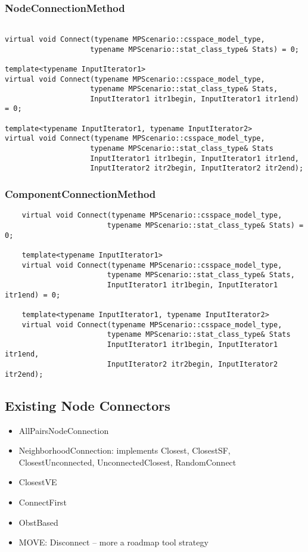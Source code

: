 \subsubsection{NodeConnectionMethod}
\begin{lstlisting}

virtual void Connect(typename MPScenario::csspace_model_type, 
                    typename MPScenario::stat_class_type& Stats) = 0;
		       
template<typename InputIterator1>
virtual void Connect(typename MPScenario::csspace_model_type, 
                    typename MPScenario::stat_class_type& Stats,
		            InputIterator1 itr1begin, InputIterator1 itr1end) = 0;

template<typename InputIterator1, typename InputIterator2>
virtual void Connect(typename MPScenario::csspace_model_type, 
                    typename MPScenario::stat_class_type& Stats
		            InputIterator1 itr1begin, InputIterator1 itr1end,
		            InputIterator2 itr2begin, InputIterator2 itr2end);
\end{lstlisting}

\subsubsection{ComponentConnectionMethod}

\begin{lstlisting}
    virtual void Connect(typename MPScenario::csspace_model_type, 
                        typename MPScenario::stat_class_type& Stats) = 0;

    template<typename InputIterator1>
    virtual void Connect(typename MPScenario::csspace_model_type, 
                        typename MPScenario::stat_class_type& Stats,
    		            InputIterator1 itr1begin, InputIterator1 itr1end) = 0;

    template<typename InputIterator1, typename InputIterator2>
    virtual void Connect(typename MPScenario::csspace_model_type, 
                        typename MPScenario::stat_class_type& Stats
    		            InputIterator1 itr1begin, InputIterator1 itr1end,
    		            InputIterator2 itr2begin, InputIterator2 itr2end);
\end{lstlisting}

\subsection{Existing Node Connectors}
\begin{itemize}
\item AllPairsNodeConnection
\item NeighborhoodConnection: implements Closest, ClosestSF, ClosestUnconnected,
UnconnectedClosest, RandomConnect
\item ClosestVE
\item ConnectFirst
\item ObstBased
\item MOVE: Disconnect -- more a roadmap tool strategy
\end{itemize}


